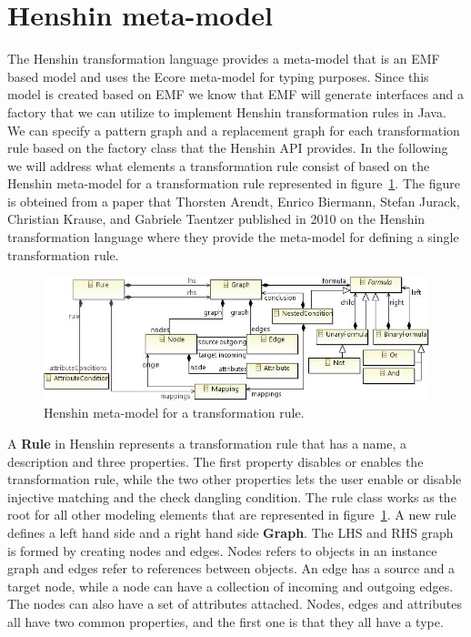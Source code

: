 
\section{Henshin meta-model}
\label{sec:henshin_meta}

The Henshin transformation language provides a meta-model that is an EMF based
model and uses the Ecore meta-model for typing purposes\cite{Arendt2010}. Since
this model is created based on EMF we know that EMF will generate interfaces and
a factory that we can utilize to implement Henshin transformation rules in Java.
We can specify a pattern graph and a replacement graph for each transformation
rule based on the factory class that the Henshin API provides. In the following
we will address what elements a transformation rule consist of based on
the Henshin meta-model for a transformation rule represented in
figure~\ref{fig:Henshin_metamodel}. The figure is obteined from a paper that
Thorsten Arendt, Enrico Biermann, Stefan Jurack, Christian Krause, and Gabriele
Taentzer published in 2010 on the Henshin transformation language where they
provide the meta-model for defining a single transformation
rule\cite{Arendt2010}.

\begin{figure}[H]
	\centering
	\includegraphics[scale=0.8]{./Figures/Henshin_metamodel.png}
	\caption[Henshin meta-model for a transformation rule]
	{Henshin meta-model for a transformation rule.}
	\label{fig:Henshin_metamodel}
\end{figure}

A \textbf{Rule} in Henshin represents a transformation rule that has a name,
a description and three properties. The first property disables or enables the
transformation rule, while the two other properties lets the user enable or
disable injective matching and the check dangling condition. The rule class
works as the root for all other modeling elements that are represented in 
figure~\ref{fig:Henshin_metamodel}. A new rule defines a left hand side and a
right hand side \textbf{Graph}. The LHS and RHS graph is formed by
creating nodes and edges. Nodes refers to objects in an instance graph and
edges refer to references between objects. An edge has a source and a target
node, while a node can have a collection of incoming and outgoing edges. The
nodes can also have a set of attributes attached. Nodes, edges and attributes
all have two common properties, and the first one is that they all have a type.

